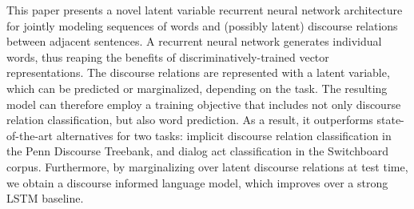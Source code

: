 This paper presents a novel latent variable recurrent neural network architecture for jointly modeling sequences of words and (possibly latent) discourse relations between adjacent sentences. A recurrent neural network generates individual words, thus reaping the benefits of discriminatively-trained vector representations. The discourse relations are represented with a latent variable, which can be predicted or marginalized, depending on the task. The resulting model can therefore employ a training objective that includes not only discourse relation classification, but also word prediction. As a result, it outperforms state-of-the-art alternatives for two tasks: implicit discourse relation classification in the Penn Discourse Treebank, and dialog act classification in the Switchboard corpus. Furthermore, by marginalizing over latent discourse relations at test time, we obtain a discourse informed language model, which improves over a strong LSTM baseline.
